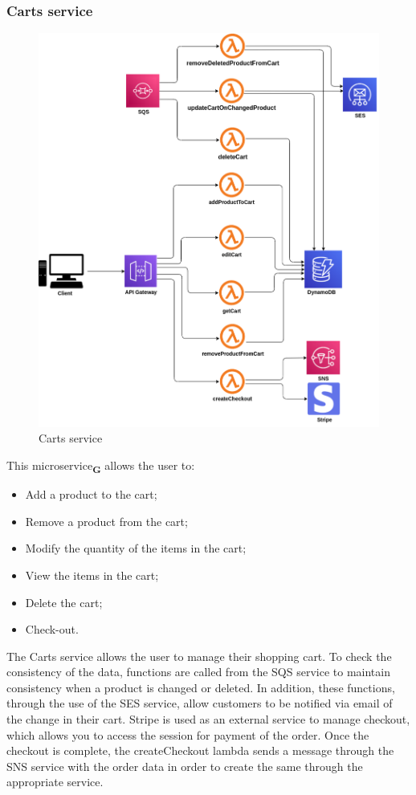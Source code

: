 \subsubsection{Carts service}
\begin{figure}[!h]
    \vspace{5px}
    \includegraphics[scale=0.5]{../../../../Images/Diagrammi/maintainerManual/cartService.png}
    \centering
    \caption{Carts service}
\end{figure}
This microservice\textsubscript{\textbf{G}} allows the user to:
\begin{itemize}
    \item Add a product to the cart;
    \item Remove a product from the cart;
    \item Modify the quantity of the items in the cart;
    \item View the items in the cart;
    \item Delete the cart;
    \item Check-out.
\end{itemize}
The Carts service allows the user to manage their shopping cart.
To check the consistency of the data, functions are called from the SQS service to maintain consistency when a product is changed or deleted.
In addition, these functions, through the use of the SES service, allow customers to be notified via email of the change in their cart.
Stripe is used as an external service to manage checkout, which allows you to access the session for payment of the order. Once the checkout is complete, the createCheckout lambda sends a message through the SNS service with the order data in order to create the same through the appropriate service.
\pagebreak
